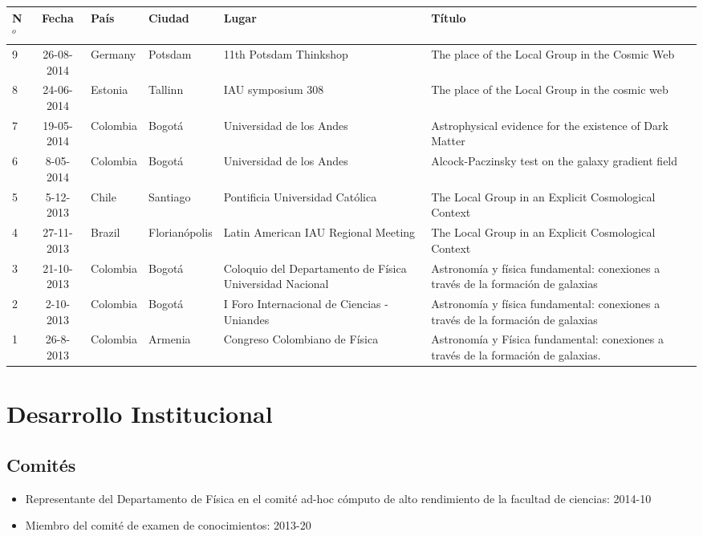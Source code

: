 \documentclass{article}
\begin{document}
\begin{tabular}{l c l l p{2cm} p{5cm}}\hline
N$^{o}$ & Fecha & Pa\'is & Ciudad & Lugar & T\'itulo \\\hline
9 & 26-08-2014 & Germany & Potsdam & 11th Potsdam Thinkshop & The
place of the Local Group in the Cosmic Web\\ \hline
8 & 24-06-2014 & Estonia & Tallinn & IAU symposium 308 & The place of the
Local Group in the cosmic web\\ \hline
7 & 19-05-2014 & Colombia & Bogot\'a & Universidad de los Andes &
Astrophysical evidence for the existence of Dark Matter\\ \hline
6 & 8-05-2014 & Colombia & Bogot\'a & Universidad de los Andes &
Alcock-Paczinsky test on the galaxy gradient field \\ \hline
5 & 5-12-2013 & Chile & Santiago & Pontificia Universidad Cat\'olica &
The Local Group in an Explicit Cosmological Context\\\hline 
4 & 27-11-2013 & Brazil & Florian\'opolis & Latin American IAU
Regional Meeting & The Local Group in an Explicit Cosmological
Context\\\hline 
3 & 21-10-2013 & Colombia & Bogot\'a & Coloquio del Departamento de
F\'isica Universidad Nacional & Astronom\'ia y f\'isica fundamental:
conexiones a trav\'es de la formaci\'on de galaxias\\\hline 
2 & 2-10-2013 & Colombia & Bogot\'a & I Foro Internacional de Ciencias
- Uniandes & Astronom\'ia y f\'isica fundamental: conexiones a
trav\'es de la formaci\'on de galaxias\\\hline 
1 & 26-8-2013 & Colombia & Armenia & Congreso Colombiano de F\'isica &
Astronom\'ia y F\'isica fundamental: conexiones a trav\'es de la
formaci\'on de galaxias.\\  \hline 
\end{tabular}
\section{Desarrollo Institucional}

\subsection{Comit\'es}
\begin{itemize}
\item {Representante del Departamento de F\'isica en el comit\'e
  ad-hoc c\'omputo de alto rendimiento de la facultad de ciencias}:
  2014-10  
\item {Miembro del comit\'e de examen de conocimientos}: 2013-20 
\end{itemize}
\end{document}
